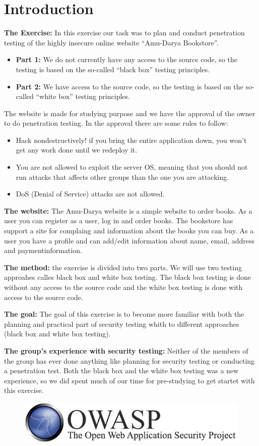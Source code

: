 \clearpage
\section{Introduction}

{\bf The Exercise:} In this exercise our task was to plan and conduct penetration testing 
of the highly insecure online website “Amu-Darya Bookstore”. 
	\begin{itemize}
		\item {\bf Part 1:} We do not currently have any access to the source code, so the 
		testing is based on the so-called “black box” testing principles.
		\item {\bf Part 2:} We have access to the source code, so the testing is based on 
		the so-called “white box” testing principles.
	\end{itemize}


The website is made for studying purpose and we have the approval of the owner to do 
penetration testing. In the approval there are some rules to follow:
\begin{itemize}
	\item Hack nondestructively! if you bring the entire application down, you won’t get any work done until we redeploy it.
	\item You are not allowed to exploit the server OS, meaning that you should not run attacks that affects other groups than the one you are attacking.
	\item DoS (Denial of Service) attacks are not allowed.
\end{itemize}

{\bf The website: } The Amu-Darya website is a simple website to order books. 
As a user you can register as a user, log in and order books. The bookstore has 
support a site for complaing and information about the books you can buy.
As a user you have a profile and can add/edit information about name, email, 
address and paymentinformation.

{\bf The method:} the exercise is divided into two parts. We will use two testing 
approahes calles black box and white box testing. The black box testing is done without any access to the source code and the white box testing is done with access to the source code.

{\bf The goal:} The goal of this exercise is to become more familiar with both the planning and practical part of security testing whith to different approaches (black box and white box testing). 

{\bf The group’s experience with security testing:} Neither of the members of the group has ever done anything like planning for security testing or conducting a penetration test. Both the black box and the white box testing was a new experience, so we did spent much of our time for pre-studying to get startet with this exercise.

\begin{figure}
\includegraphics[scale=0.4]{pics/OWASP2.png}
\end{figure}
